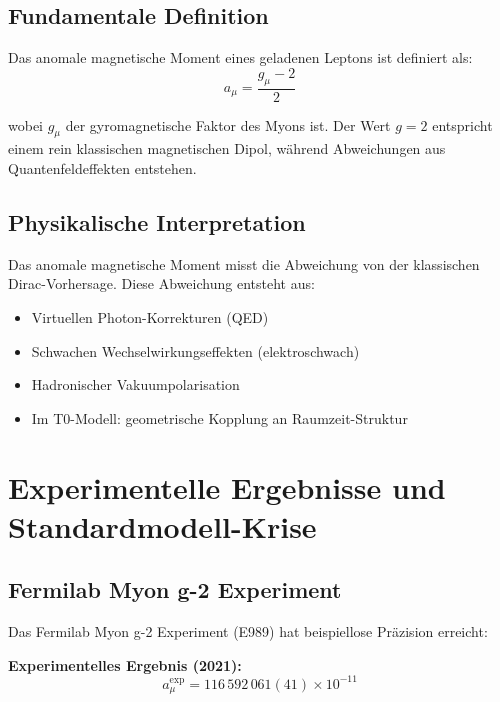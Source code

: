 \documentclass[12pt,a4paper]{report}
\begin{document}
\subsection{Fundamentale Definition}
\label{subsec:fundamental_definition}

Das anomale magnetische Moment eines geladenen Leptons ist definiert als:
\begin{equation}
	a_\mu = \frac{g_\mu - 2}{2}
	\label{eq:anomalous_moment_definition}
\end{equation}

wobei $g_\mu$ der gyromagnetische Faktor des Myons ist. Der Wert $g = 2$ entspricht einem rein klassischen magnetischen Dipol, während Abweichungen aus Quantenfeldeffekten entstehen.

\subsection{Physikalische Interpretation}
\label{subsec:physical_interpretation}

Das anomale magnetische Moment misst die Abweichung von der klassischen Dirac-Vorhersage. Diese Abweichung entsteht aus:
\begin{itemize}
	\item Virtuellen Photon-Korrekturen (QED)
	\item Schwachen Wechselwirkungseffekten (elektroschwach)
	\item Hadronischer Vakuumpolarisation
	\item Im T0-Modell: geometrische Kopplung an Raumzeit-Struktur
\end{itemize}

\section{Experimentelle Ergebnisse und Standardmodell-Krise}
\label{sec:experimental_results}

\subsection{Fermilab Myon g-2 Experiment}
\label{subsec:fermilab_results}

Das Fermilab Myon g-2 Experiment (E989) hat beispiellose Präzision erreicht:

\textbf{Experimentelles Ergebnis (2021):}
\begin{equation}
	a_\mu^{\text{exp}} = 116\,592\,061(41) \times 10^{-11}
	\label{eq:experimental_value}
\end{equation}
\end{document}
